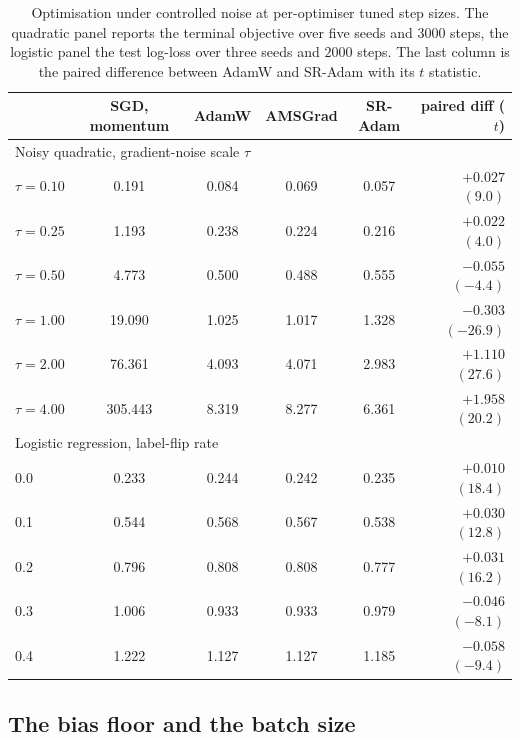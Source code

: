 \documentclass[pdflatex,sn-mathphys-num]{sn-jnl}%
\theoremstyle{thmstyleone}%
\theoremstyle{thmstyletwo}%
\theoremstyle{thmstylethree}%
\begin{document}
\begin{table}[t]
\centering
\caption{Optimisation under controlled noise at per-optimiser tuned step sizes. The quadratic panel reports the terminal objective over five seeds and $3000$ steps, the logistic panel the test log-loss over three seeds and $2000$ steps. The last column is the paired difference between AdamW and SR-Adam with its $t$ statistic.}
\label{tab:opt_noise}
\footnotesize\setlength{\tabcolsep}{3.5pt}
\begin{tabular}{lccccr}
\toprule
 & SGD, momentum & AdamW & AMSGrad & SR-Adam & paired diff ($t$) \\
\midrule
\multicolumn{6}{l}{Noisy quadratic, gradient-noise scale $\tau$} \\
$\tau=0.10$ & 0.191 & 0.084 & 0.069 & 0.057 & $+0.027$ $(9.0)$ \\
$\tau=0.25$ & 1.193 & 0.238 & 0.224 & 0.216 & $+0.022$ $(4.0)$ \\
$\tau=0.50$ & 4.773 & 0.500 & 0.488 & 0.555 & $-0.055$ $(-4.4)$ \\
$\tau=1.00$ & 19.090 & 1.025 & 1.017 & 1.328 & $-0.303$ $(-26.9)$ \\
$\tau=2.00$ & 76.361 & 4.093 & 4.071 & 2.983 & $+1.110$ $(27.6)$ \\
$\tau=4.00$ & 305.443 & 8.319 & 8.277 & 6.361 & $+1.958$ $(20.2)$ \\
\midrule
\multicolumn{6}{l}{Logistic regression, label-flip rate} \\
0.0 & 0.233 & 0.244 & 0.242 & 0.235 & $+0.010$ $(18.4)$ \\
0.1 & 0.544 & 0.568 & 0.567 & 0.538 & $+0.030$ $(12.8)$ \\
0.2 & 0.796 & 0.808 & 0.808 & 0.777 & $+0.031$ $(16.2)$ \\
0.3 & 1.006 & 0.933 & 0.933 & 0.979 & $-0.046$ $(-8.1)$ \\
0.4 & 1.222 & 1.127 & 1.127 & 1.185 & $-0.058$ $(-9.4)$ \\
\bottomrule
\end{tabular}
\end{table}

\subsection{The bias floor and the batch size}
\end{document}
